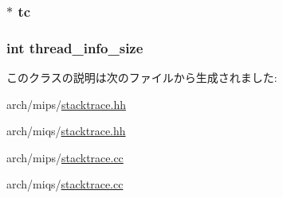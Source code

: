 \label{classMipsISA_1_1ProcessInfo_a6bca839d8255baba5c53a5eace70d72e}
\hypertarget{classMipsISA_1_1ProcessInfo_a7d1b4bb6199b71a875f0eb5d9c19022b}{
\subsubsection[{tc}]{ $\ast$ {\bf tc}}}
\label{classMipsISA_1_1ProcessInfo_a7d1b4bb6199b71a875f0eb5d9c19022b}
\hypertarget{classMipsISA_1_1ProcessInfo_aa02520c2e86b94388e0d4f4a7b0873b3}{
\subsubsection[{thread\_\-info\_\-size}]{\setlength{\rightskip}{0pt plus 5cm}int {\bf thread\_\-info\_\-size}}}
\label{classMipsISA_1_1ProcessInfo_aa02520c2e86b94388e0d4f4a7b0873b3}


このクラスの説明は次のファイルから生成されました:\begin{DoxyCompactItemize}
\item 
arch/mips/\hyperlink{mips_2stacktrace_8hh}{stacktrace.hh}\item 
arch/miqs/\hyperlink{miqs_2stacktrace_8hh}{stacktrace.hh}\item 
arch/mips/\hyperlink{mips_2stacktrace_8cc}{stacktrace.cc}\item 
arch/miqs/\hyperlink{miqs_2stacktrace_8cc}{stacktrace.cc}\end{DoxyCompactItemize}
